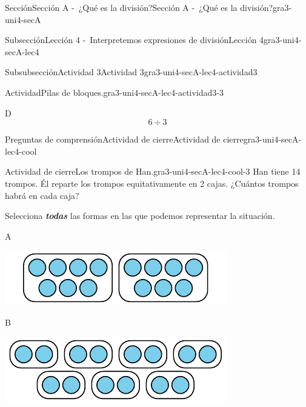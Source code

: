 \documentclass[twoside,10pt,]{article}
\newcommand{\alert}[1]{\textbf{\textit{#1}}}
\begin{document}
\begin{sectionptx}{Sección}{Sección A -~¿Qué es la división?}{}{Sección A -~¿Qué es la división?}{}{}{gra3-uni4-secA}
\begin{subsectionptx}{Subsección}{Lección 4 -~Interpretemos expresiones de división}{}{Lección 4}{}{}{gra3-uni4-secA-lec4}
\begin{subsubsectionptx}{Subsubsección}{Actividad 3}{}{Actividad 3}{}{}{gra3-uni4-secA-lec4-actividad3}
\begin{activity}{Actividad}{Pilas de bloques.}{gra3-uni4-secA-lec4-actividad3-3}
\begin{sidebyside}{2}{0.05}{0.05}{0.1}
\begin{sbspanel}{0.4}%
\par
D%
\begin{equation*}
6\div 3
\end{equation*}
%
\end{sbspanel}%
\end{sidebyside}%
\end{activity}%
\end{subsubsectionptx}
%
%
\typeout{************************************************}
\typeout{************************************************}
%
\begin{reading-questions-subsubsection}{Preguntas de comprensión}{Actividad de cierre}{}{Actividad de cierre}{}{}{gra3-uni4-secA-lec4-cool}
\begin{project}{Actividad de cierre}{Los trompos de Han.}{gra3-uni4-secA-lec4-cool-3}%
Han tiene 14 trompos. Él reparte los trompos equitativamente en 2 cajas. ¿Cuántos trompos habrá en cada caja?%
\par
Selecciona \alert{todas} las formas en las que podemos representar la situación.%
\begin{sidebyside}{4}{0.0075}{0.0075}{0.015}%
\begin{sbspanel}{0.02}%
A%
\end{sbspanel}%
\begin{sbspanel}{0.45}%
\includegraphics[width=\linewidth]{external/svg-source/tikz-file-151100.pdf}
\end{sbspanel}%
\begin{sbspanel}{0.02}%
B%
\end{sbspanel}%
\begin{sbspanel}{0.45}%
\includegraphics[width=\linewidth]{external/svg-source/tikz-file-151101.pdf}

\end{sbspanel}
\end{sidebyside}
\end{project}
\end{reading-questions-subsubsection}
\end{subsectionptx}
\end{sectionptx}
\end{document}
